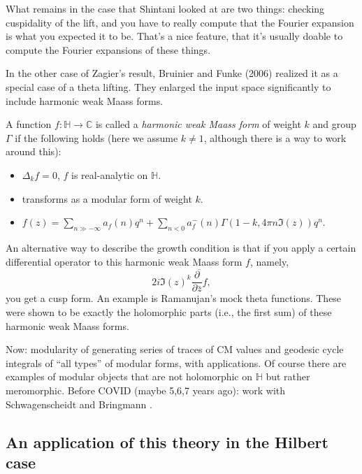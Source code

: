 \documentclass[reqno]{amsart} 
\numberwithin{theorem}{section}
\numberwithin{equation}{section}
\begin{document}
What remains in the case that Shintani looked at are two things: checking cuspidality of the lift, and you have to really compute that the Fourier expansion is what you expected it to be.  That's a nice feature, that it's usually doable to compute the Fourier expansions of these things.

In the other case of Zagier's result, Bruinier and Funke (2006) realized it as a special case of a theta lifting.   They enlarged the input space significantly to include harmonic weak Maass forms.
\begin{definition}
  A function $f : \mathbb{H} \rightarrow \mathbb{C}$ is called a \emph{harmonic weak Maass form} of weight $k$ and group $\Gamma$ if the following holds (here we assume $k \neq 1$, although there is a way to work around this):
  \begin{itemize}
  \item $\Delta_k f = 0$, $f$ is real-analytic on $\mathbb{H}$.
  \item transforms as a modular form of weight $k$.
  \item $f(z) = \sum_{n \gg - \infty} a_f(n) q^n + \sum_{n < 0} a_f^-(n) \Gamma(1 - k, 4 \pi n \Im(z)) q^n$.
  \end{itemize}
\end{definition}

An alternative way to describe the growth condition is that if you apply a certain differential operator to this harmonic weak Maass form $f$, namely,
\begin{equation*}
  2 i \Im(z)^k \overline{\frac{\partial}{ \partial \bar{z}} f},
\end{equation*}
you get a cusp form.  An example is Ramanujan's mock theta functions.  These were shown to be exactly the holomorphic parts (i.e., the first sum) of these harmonic weak Maass forms.

Now: modularity of generating series of traces of CM values and geodesic cycle integrals of ``all types'' of modular forms, with applications.  Of course there are examples of modular objects that are not holomorphic on $\mathbb{H}$ but rather meromorphic.  Before COVID (maybe 5,6,7 years ago): work with Schwagenscheidt and Bringmann \cite{2018arXiv1810.00612}.

\subsection{An application of this theory in the Hilbert case}
\end{document}

